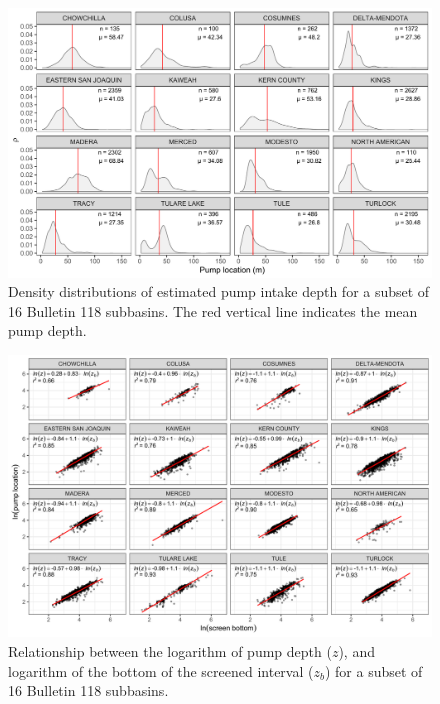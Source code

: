 \begin{figure}
	\includegraphics[width=\textwidth]{ch2_appendix_figs/erl_pump_loc_density.pdf}
	\caption{Density distributions of estimated pump intake depth for a subset of 16 Bulletin 118 subbasins. The red vertical line indicates the mean pump depth.}
	\label{fig:pump_loc_density}
\end{figure}

\begin{figure}[ht]
	\includegraphics[width=\textwidth]{ch2_appendix_figs/erl_pump_loc_bot_eq.pdf}
	\caption{Relationship between the logarithm of pump depth ($z$), and logarithm of the bottom of the screened interval ($z_{b}$) for a subset of 16 Bulletin 118 subbasins.}
	\label{fig:pump_loc_bottom}
\end{figure}

